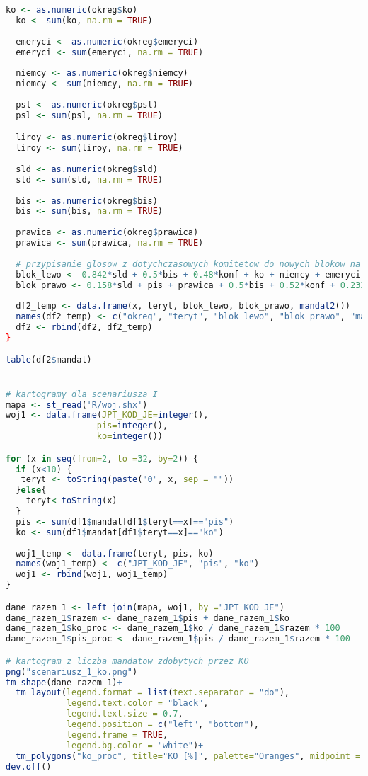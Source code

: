 \documentclass[12pt, a4paper, fleqn]{report}
\begin{document}
\begin{lstlisting}[language=R]
  ko <- as.numeric(okreg$ko)
  ko <- sum(ko, na.rm = TRUE)
  
  emeryci <- as.numeric(okreg$emeryci)
  emeryci <- sum(emeryci, na.rm = TRUE)
  
  niemcy <- as.numeric(okreg$niemcy)
  niemcy <- sum(niemcy, na.rm = TRUE)
  
  psl <- as.numeric(okreg$psl)
  psl <- sum(psl, na.rm = TRUE)

  liroy <- as.numeric(okreg$liroy)
  liroy <- sum(liroy, na.rm = TRUE)
  
  sld <- as.numeric(okreg$sld)
  sld <- sum(sld, na.rm = TRUE)
  
  bis <- as.numeric(okreg$bis)
  bis <- sum(bis, na.rm = TRUE)
  
  prawica <- as.numeric(okreg$prawica)
  prawica <- sum(prawica, na.rm = TRUE)
  
  # przypisanie glosow z dotychczasowych komitetow do nowych blokow na podstawie wzoru
  blok_lewo <- 0.842*sld + 0.5*bis + 0.48*konf + ko + niemcy + emeryci + 0.767*psl
  blok_prawo <- 0.158*sld + pis + prawica + 0.5*bis + 0.52*konf + 0.233*psl + liroy
  
  df2_temp <- data.frame(x, teryt, blok_lewo, blok_prawo, mandat2())
  names(df2_temp) <- c("okreg", "teryt", "blok_lewo", "blok_prawo", "mandat")
  df2 <- rbind(df2, df2_temp)
}

table(df2$mandat)


# kartogramy dla scenariusza I
mapa <- st_read('R/woj.shx')
woj1 <- data.frame(JPT_KOD_JE=integer(),
                  pis=integer(),
                  ko=integer())

for (x in seq(from=2, to =32, by=2)) {
  if (x<10) {
   teryt <- toString(paste("0", x, sep = "")) 
  }else{
    teryt<-toString(x)
  }
  pis <- sum(df1$mandat[df1$teryt==x]=="pis")
  ko <- sum(df1$mandat[df1$teryt==x]=="ko")
  
  woj1_temp <- data.frame(teryt, pis, ko)
  names(woj1_temp) <- c("JPT_KOD_JE", "pis", "ko")
  woj1 <- rbind(woj1, woj1_temp)
}

dane_razem_1 <- left_join(mapa, woj1, by ="JPT_KOD_JE")
dane_razem_1$razem <- dane_razem_1$pis + dane_razem_1$ko
dane_razem_1$ko_proc <- dane_razem_1$ko / dane_razem_1$razem * 100
dane_razem_1$pis_proc <- dane_razem_1$pis / dane_razem_1$razem * 100

# kartogram z liczba mandatow zdobytych przez KO
png("scenariusz_1_ko.png")
tm_shape(dane_razem_1)+
  tm_layout(legend.format = list(text.separator = "do"),
            legend.text.color = "black",
            legend.text.size = 0.7,
            legend.position = c("left", "bottom"),
            legend.frame = TRUE,
            legend.bg.color = "white")+
  tm_polygons("ko_proc", title="KO [%]", palette="Oranges", midpoint = 100)
dev.off()


\end{lstlisting}
\end{document}
